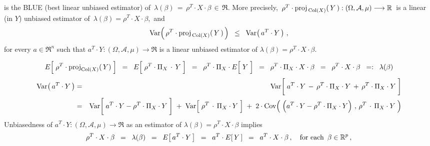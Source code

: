 \begin{theorem}
\begin{equation*}
\end{equation*}
is the BLUE (best linear unbiased estimator) of
\,$\lambda(\beta) \,=\, \rho^{T} \cdot X \cdot \beta \,\in\, \Re$.
More precisely,
\,$\rho^{T} \cdot \proj_{\,\Col(X)}\!\left(\,Y\,\right) : (\Omega,\mathcal{A},\mu) \longrightarrow \Re$\,
is a linear (in $Y$) unbiased estimator of
\,$\lambda(\beta) = \rho^{T} \cdot X \cdot \beta$,\, and
\begin{equation*}
\Var\!\left(\,\rho^{T} \cdot \proj_{\,\Col(X)}\!\left(\,Y\,\right)\,\right)
\;\; \leq \;\;
	\Var\!\left(\,a^{T} \cdot Y\,\right)\,,
\end{equation*}
for every $a \in \Re^{n}$ such that
$a^{T} \cdot Y : (\Omega,\mathcal{A},\mu) \longrightarrow \Re$
is a linear unbiased estimator of
$\lambda(\beta) = \rho^{T} \cdot X \cdot \beta$.
\end{theorem}
\proof
\begin{equation*}
E\!\left[\;\rho^{T} \cdot \proj_{\Col(X)}(\,Y)\;\right]
\;\; = \;\;
	E\!\left[\;\rho^{T} \cdot \Pi_{X} \overset{{\color{white}+}}{\cdot} Y\;\right]
\;\; = \;\;
	\rho^{T} \cdot \Pi_{X} \cdot E\!\left[\;\overset{{\color{white}.}}{Y}\;\right]
\;\; = \;\;
	\rho^{T} \cdot \Pi_{X} \cdot X \cdot \beta
\;\; = \;\;
	\rho^{T} \cdot X \cdot \beta
\;\; =: \;\;
	\lambda(\beta)
\end{equation*}
\begin{eqnarray*}
\Var\!\left(\,a^{T} \cdot Y\,\right)
&=&
	\Var\!\left[\;
		a^{T} \cdot Y
		\,\overset{{\color{white}+}}{-}\,
		\rho^{T} \cdot \Pi_{X} \cdot Y
		\,+\,
		\rho^{T} \cdot \Pi_{X} \cdot Y
		\;\right]
\\
&=&
	\Var\!\left[\;
		a^{T} \cdot Y
		\overset{{\color{white}+}}{-}
		\rho^{T} \cdot \Pi_{X} \cdot Y
		\;\right]
	\; + \;
	\Var\!\left[\;
		\rho^{T} \overset{{\color{white}+}}{\cdot} \Pi_{X} \cdot Y
		\;\right]
	\; + \;
	2\cdot\Cov\!\left(\;
		\left(a^{T} \cdot Y
		\overset{{\color{white}.}}{-}
		\rho^{T} \cdot \Pi_{X} \cdot Y\right)
		\,,\,
		\rho^{T} \overset{{\color{white}+}}{\cdot} \Pi_{X} \cdot Y
		\;\right)		
\end{eqnarray*}
Unbiasedness of $a^{T} \cdot Y : (\Omega,\mathcal{A},\mu) \longrightarrow \Re$
as an estimator of $\lambda(\beta) = \rho^{T} \cdot X \cdot \beta$ implies
\begin{equation*}
\rho^{T} \cdot X \cdot \beta
\;\; = \;\;
	\lambda(\beta)
\;\; = \;\;
	E\!\left[\,a^{T} \cdot Y\,\right]
\;\; = \;\;
	a^{T} \cdot E\!\left[\,Y\,\right]
\;\; = \;\;
	a^{T} \cdot X \cdot \beta\,,
\quad
\textnormal{for each \,$\beta \in \Re^{p}$}\,,
\end{equation*}
